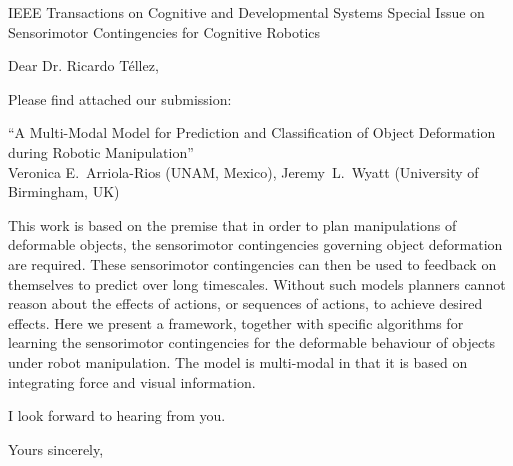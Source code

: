 \documentclass[a4paper,10pt]{letter}
\begin{document}

\begin{letter}{IEEE Transactions on Cognitive and Developmental Systems\newline
Special Issue on Sensorimotor Contingencies for Cognitive Robotics}
\address{Facultad de Ciencias, \\Ciudad Universitaria,\\ UNAM, México, D.F.}

\opening{Dear Dr. Ricardo Téllez,}

Please find attached our submission:
\begin{center}
 ``A Multi-Modal Model for Prediction and Classification of Object Deformation during Robotic Manipulation'' \\
 Veronica E.~Arriola-Rios (UNAM, Mexico), Jeremy~L.~Wyatt (University of Birmingham, UK)
\end{center}

This work is based on the premise that in order to plan manipulations of deformable objects, the sensorimotor contingencies governing object deformation are required. These sensorimotor contingencies can then be used to feedback on themselves to predict over long timescales. Without such models planners cannot reason about the effects of actions, or sequences of actions, to achieve desired effects.
Here we present a framework, together with specific algorithms for learning the sensorimotor contingencies for the deformable behaviour of objects under robot manipulation.
The model is multi-modal in that it is based on integrating force and visual information.

I look forward to hearing from you.


\signature{Dra. Verónica Esther Arriola Ríos\\
Profesora Asociada C de T.C.\newline
Departamento de Matemáticas, Cub 119.\newline
Facultad de Ciencias, UNAM \newline
v.arriola@ciencias.unam.mx \newline
+(52)55 5622 5426}

\closing{Yours sincerely,}


\end{letter}
\end{document}
